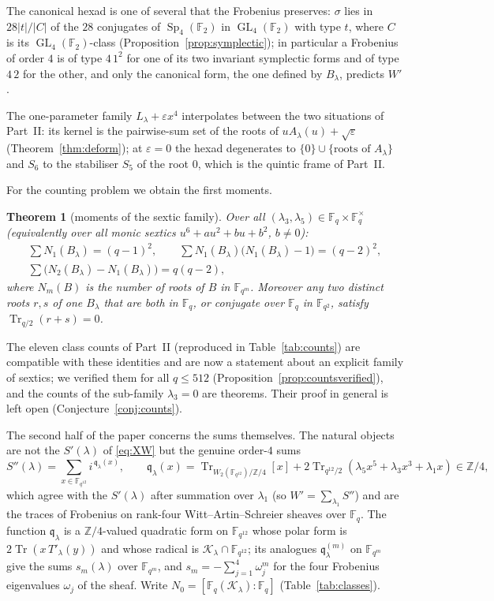 \documentclass[12pt,a4paper]{amsart}
\newtheorem{theorem}{Theorem}[section]
\theoremstyle{definition}
\newcommand{\F}{\mathbb{F}}
\newcommand{\Z}{\mathbb{Z}}
\newcommand{\Tr}{\operatorname{Tr}}
\newcommand{\Sp}{\operatorname{Sp}}
\newcommand{\GL}{\operatorname{GL}}
\newcommand{\eps}{\varepsilon}
\newcommand{\Kk}{\mathcal{K}}
\newcommand{\qq}{\mathfrak{q}}
\newcommand{\Spp}{S''}
\begin{document}
The canonical hexad is one of several that the Frobenius preserves: $\sigma$ lies in $28|t|/|C|$ of the $28$ conjugates of $\Sp_4(\F_2)$ in $\GL_4(\F_2)$ with type $t$, where $C$ is its $\GL_4(\F_2)$-class (Proposition~\ref{prop:symplectic}); in particular a Frobenius of order $4$ is of type $4\,1^2$ for one of its two invariant symplectic forms and of type $4\,2$ for the other, and only the canonical form, the one defined by $B_\lambda$, predicts $W'$.

The one-parameter family $L_\lambda+\eps x^4$ interpolates between the two situations of Part~II: its kernel is the pairwise-sum set of the roots of $uA_\lambda(u)+\sqrt\eps$ (Theorem~\ref{thm:deform}); at $\eps=0$ the hexad degenerates to $\{0\}\cup\{\text{roots of }A_\lambda\}$ and $S_6$ to the stabiliser $S_5$ of the root $0$, which is the quintic frame of Part~II.

For the counting problem we obtain the first moments.

\begin{theorem}[moments of the sextic family]\label{thm:moments}
Over all $(\lambda_3,\lambda_5)\in\F_q\times\F_q^\times$ (equivalently over all monic sextics $u^6+au^2+bu+b^2$, $b\ne0$):
\begin{gather*}
\sum N_1(B_\lambda)=(q-1)^2,\qquad \sum N_1(B_\lambda)\bigl(N_1(B_\lambda)-1\bigr)=(q-2)^2,\\
\sum\bigl(N_2(B_\lambda)-N_1(B_\lambda)\bigr)=q(q-2),
\end{gather*}
where $N_m(B)$ is the number of roots of $B$ in $\F_{q^m}$. Moreover any two distinct roots $r,s$ of one $B_\lambda$ that are both in $\F_q$, or conjugate over $\F_q$ in $\F_{q^2}$, satisfy $\Tr_{q/2}(r+s)=0$.
\end{theorem}

The eleven class counts of Part~II (reproduced in Table~\ref{tab:counts}) are compatible with these identities and are now a statement about an explicit family of sextics; we verified them for all $q\le512$ (Proposition~\ref{prop:countsverified}), and the counts of the sub-family $\lambda_3=0$ are theorems. Their proof in general is left open (Conjecture~\ref{conj:counts}).

The second half of the paper concerns the sums themselves. The natural objects are not the $S'(\lambda)$ of \eqref{eq:XW} but the genuine order-$4$ sums
\begin{equation}\label{eq:Spp}
\Spp(\lambda)=\sum_{x\in\F_{q^{12}}}i^{\,\qq_\lambda(x)},\qquad \qq_\lambda(x)=\Tr_{W_2(\F_{q^{12}})/\Z/4}[x]+2\Tr_{q^{12}/2}(\lambda_5x^5+\lambda_3x^3+\lambda_1x)\in\Z/4,
\end{equation}
which agree with the $S'(\lambda)$ after summation over $\lambda_1$ (so $W'=\sum_{\lambda_1}\Spp$) and are the traces of Frobenius on rank-four Witt--Artin--Schreier sheaves over $\F_q$. The function $\qq_\lambda$ is a $\Z/4$-valued quadratic form on $\F_{q^{12}}$ whose polar form is $2\Tr(x\,T'_\lambda(y))$ and whose radical is $\Kk_\lambda\cap\F_{q^{12}}$; its analogues $\qq^{(m)}_\lambda$ on $\F_{q^m}$ give the sums $s_m(\lambda)$ over $\F_{q^m}$, and $s_m=-\sum_{j=1}^4\omega_j^m$ for the four Frobenius eigenvalues $\omega_j$ of the sheaf. Write $N_0=[\F_q(\Kk_\lambda):\F_q]$ (Table~\ref{tab:classes}).
\end{document}
